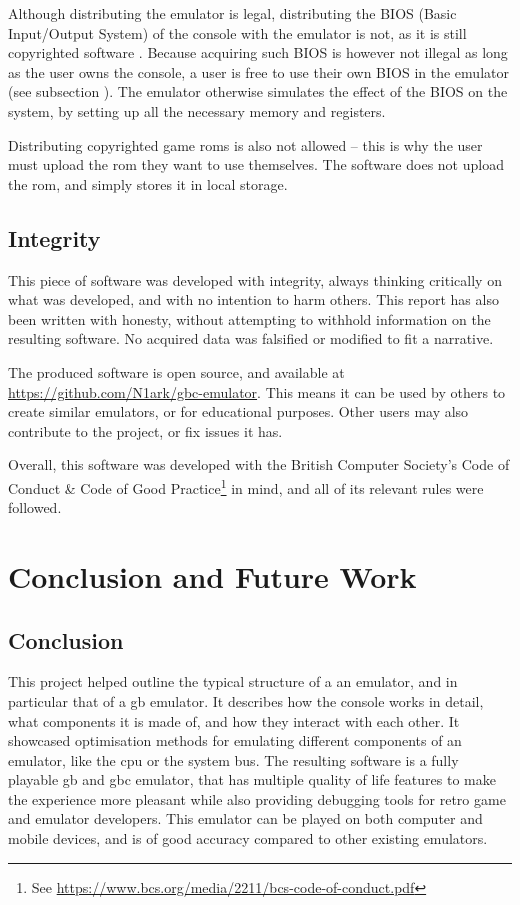 \documentclass[11pt]{informatics-report}
\newcommand{\ftnt}[1]{\footnote{See \url{#1}}}
\begin{document}
Although distributing the emulator is legal, distributing the BIOS (Basic Input/Output System) of the console with the emulator is not, as it is still copyrighted software \cite{emulation_white_paper}. Because acquiring such BIOS is however not illegal as long as the user owns the console, a user is free to use their own BIOS in the emulator (see subsection ). The emulator otherwise simulates the effect of the BIOS on the system, by setting up all the necessary memory and registers.

Distributing copyrighted game \glspl{rom} is also not allowed -- this is why the user must upload the \gls{rom} they want to use themselves. The software does not upload the \gls{rom}, and simply stores it in local storage.

\section{Integrity}

This piece of software was developed with integrity, always thinking critically on what was developed, and with no intention to harm others. This report has also been written with honesty, without attempting to withhold information on the resulting software. No acquired data was falsified or modified to fit a narrative.

The produced software is open source, and available at \url{https://github.com/N1ark/gbc-emulator}. This means it can be used by others to create similar emulators, or for educational purposes. Other users may also contribute to the project, or fix issues it has.

Overall, this software was developed with the British Computer Society's Code of Conduct \& Code of Good Practice\ftnt{https://www.bcs.org/media/2211/bcs-code-of-conduct.pdf} in mind, and all of its relevant rules were followed.

\chapter{Conclusion and Future Work}

\section{Conclusion}

This project helped outline the typical structure of a an emulator, and in particular that of a \glsdesc{gb} emulator. It describes how the console works in detail, what components it is made of, and how they interact with each other. It showcased optimisation methods for emulating different components of an emulator, like the \gls{cpu} or the system bus. The resulting software is a fully playable \glsdesc{gb} and \glsdesc{gbc} emulator, that has multiple quality of life features to make the experience more pleasant while also providing debugging tools for retro game and emulator developers. This emulator can be played on both computer and mobile devices, and is of good accuracy compared to other existing emulators.
\end{document}
